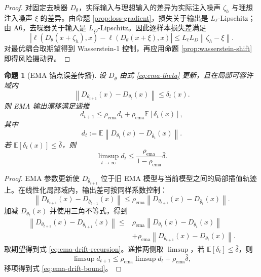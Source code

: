 \documentclass[11pt,a4paper,UTF8,fontset=fandol]{ctexart}
\newtheorem{proposition}[theorem]{命题}
\theoremstyle{definition}
\newcommand{\norm}[1]{\left\lVert#1\right\rVert}
\newcommand{\abs}[1]{\left\lvert#1\right\rvert}
\newcommand{\E}{\mathbb{E}}
\begin{document}
\begin{proof}
对固定去噪器 $D_\theta$，实际输入与理想输入的差异为实际注入噪声 $\zeta_h$ 与理想注入噪声 $\xi$ 的差异。由命题 \ref{prop:loss-gradient}，损失关于输出是 $L_\ell$-Lipschitz；由 A6，去噪器关于输入是 $L_D$-Lipschitz。因此逐样本损失差满足
\begin{equation}
    \abs{\ell(D_\theta(x+\zeta_h),x)-\ell(D_\theta(x+\xi),x)}
    \le L_\ell L_D\norm{\zeta_h-\xi}.
\end{equation}
对最优耦合取期望得到 Wasserstein-1 控制，再应用命题 \ref{prop:wasserstein-shift} 即得风险摄动界。
\end{proof}

\begin{proposition}[EMA 锚点误差传播]
\label{prop:ema-anchor}
设 $D_{\bar\theta}$ 由式 \eqref{eq:ema-theta} 更新，且在局部可容许域内
\begin{equation}
    \norm{D_{\theta_{t+1}}(x)-D_{\theta_t}(x)}\le\delta_t(x).
\end{equation}
则 EMA 输出漂移满足递推
\begin{equation}
\label{eq:ema-drift-recursion}
    d_{t+1}
    \le
    \rho_{\mathrm{ema}}d_t+
    \rho_{\mathrm{ema}}\E[\delta_t(x)],
\end{equation}
其中
\begin{equation}
    d_t:=\E\norm{D_{\theta_t}(x)-D_{\bar\theta_t}(x)}.
\end{equation}
若 $\E[\delta_t(x)]\le\bar\delta$，则
\begin{equation}
\label{eq:ema-drift-bound}
    \limsup_{t\to\infty}d_t
    \le
    \frac{\rho_{\mathrm{ema}}}{1-\rho_{\mathrm{ema}}}\bar\delta.
\end{equation}
\end{proposition}

\begin{proof}
EMA 参数更新使 $D_{\bar\theta_{t+1}}$ 位于旧 EMA 模型与当前模型之间的局部插值轨迹上。在线性化局部域内，输出差可按同样系数控制：
\begin{equation}
    \norm{D_{\theta_{t+1}}(x)-D_{\bar\theta_{t+1}}(x)}
    \le
    \rho_{\mathrm{ema}}
    \norm{D_{\theta_{t+1}}(x)-D_{\bar\theta_t}(x)}.
\end{equation}
加减 $D_{\theta_t}(x)$ 并使用三角不等式，得到
\begin{equation}
\begin{aligned}
    \norm{D_{\theta_{t+1}}(x)-D_{\bar\theta_{t+1}}(x)}
    \le&
    \rho_{\mathrm{ema}}
    \norm{D_{\theta_t}(x)-D_{\bar\theta_t}(x)}\\
    &+\rho_{\mathrm{ema}}
    \norm{D_{\theta_{t+1}}(x)-D_{\theta_t}(x)}.
\end{aligned}
\end{equation}
取期望得到式 \eqref{eq:ema-drift-recursion}。递推两侧取 $\limsup$，若 $\E[\delta_t]\le\bar\delta$，则
\begin{equation}
    \limsup d_{t+1}
    \le
    \rho_{\mathrm{ema}}\limsup d_t+
    \rho_{\mathrm{ema}}\bar\delta,
\end{equation}
移项得到式 \eqref{eq:ema-drift-bound}。
\end{proof}
\end{document}
